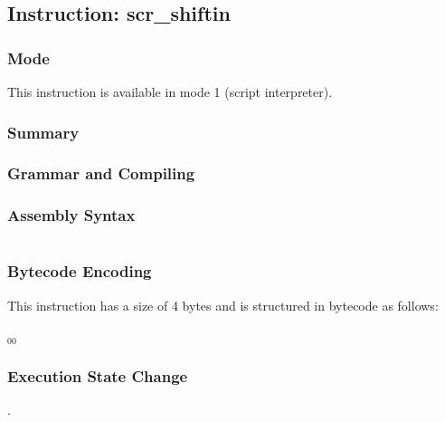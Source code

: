 \subsection{Instruction: scr\_shiftin}

\subsubsection{Mode}
This instruction is available in mode 1 (script interpreter).
\subsubsection{Summary}


\subsubsection{Grammar and Compiling}


\subsubsection{Assembly Syntax}

\begin{myquote}
\begin{verbatim}

\end{verbatim}
\end{myquote}

\subsubsection{Bytecode Encoding}

This instruction has a size of 4 bytes and is structured in bytecode as follows:

$_{00}$\ 


\subsubsection{Execution State Change}

.



